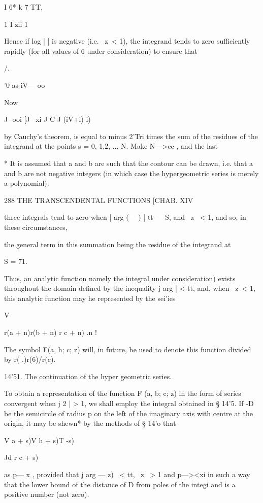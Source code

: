   I 6* k 7 TT,

1 I zii 1

Hence if log | | is negative (i.e. \ z\ < 1), the integrand tends to
zero sufficiently rapidly (for all values of 6 under consideration) to
ensure that

/.

'0 as iV— oo

Now

J -ooi [J ~xi J C J (iV+i) i)

by Cauchy's theorem, is equal to minus 2'Tri times the sum of the
residues of the integrand at the points s = 0, 1,2, ... N. Make N—>cc
, and the last

* It is assumed that a and b are such that the contour can be drawn,
i.e. that a and b are not negative integers (in which case the
hypergeometric series is merely a polynomial).

288 THE TRANSCENDENTAL FUNCTIONS [CHAB. XIV

three integrals tend to zero when | arg (— ) | tt — S, and \ z \ < 1,
and so, in these circumstances,

the general term in this summation being the residue of the integrand
at

S = 71.

Thus, an analytic function namely the integral under consideration)
exists throughout the domain defined by the inequality j arg | < tt,
and, when \ z\ < 1, this analytic function may he represented by the
sei'ies

V

r(a + n)r(b + n) r c + n) .n !

The symbol F(a, h; c; z) will, in future, be used to denote this
function divided by r( .)r(6)/r(c).

14'51. The continuation of the hyper geometric series.

To obtain a representation of the function F (a, b; c; z) in the form
of series convergent when j 2 | > 1, we shall employ the integral
obtained in § 14'5. If -D be the semicircle of radius p on the left of
the imaginary axis with centre at the origin, it may be shewn* by the
methods of § 14'o that

V a + s)V h + s)T -s)

Jd r c + s)

as p— x , provided that j arg — z) \ < tt, \ z \ > 1 and p—><xi in
such a way that the lower bound of the distance of D from poles of the
integi and is a positive number (not zero).

